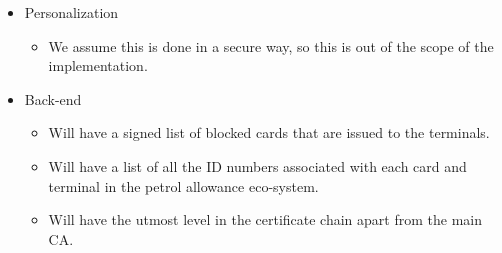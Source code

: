 \begin{itemize}
\begin{itemize}

\end{itemize}

\item Personalization
\begin{itemize}
\item We assume this is done in a secure way, so this is out of the scope of the 
implementation.
\end{itemize}

 
\item Back-end
\begin{itemize}
	\item Will have a signed list of blocked cards that are issued to the terminals.
	\item Will have a list of all the ID numbers associated with each card and terminal in the petrol allowance eco-system.
	\item Will have the utmost level in the certificate chain apart from the main CA.
\end{itemize}
\end{itemize}
